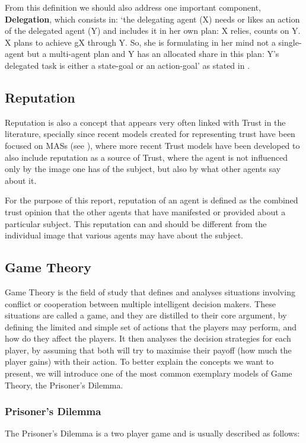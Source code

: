 From this definition we should also address one important component, \textbf{Delegation}, which consists in: `the delegating agent (X) needs or likes an action of the delegated agent (Y) and includes it in her own plan: X relies, counts on Y. X plans to achieve gX through Y. So, she is formulating in her mind not a single-agent but a multi-agent plan and Y has an allocated share in this plan: Y’s delegated task is either a state-goal or an action-goal' as stated in \cite{Castelfranchi1998}.



\subsection{Reputation}
\label{subsec:Reputation}
Reputation is also a concept that appears very often linked with Trust in the literature, specially since recent models created for representing trust have been focused on \acp{MAS} (see \cite{Abdul-rahman2000, Sabater2002, Sabater2006, Huynh2006, Pinyol2009}), where more recent Trust models have been developed to also include reputation as a source of Trust, where the agent is not influenced only by the image one has of the subject, but also by what other agents say about it.

For the purpose of this report, reputation of an agent is defined as the combined trust opinion that the other agents that have manifested or provided about a particular subject. This reputation can and should be different from the individual image that various agents may have about the subject.


\subsection{Game Theory}
\label{subsec:GameTheory}
Game Theory is the field of study that defines and analyses situations involving conflict or cooperation between multiple intelligent decision makers. These situations are called a game, and they are distilled to their core argument, by defining the limited and simple set of actions that the players may perform, and how do they affect the players. It then analyses the decision strategies for each player, by assuming that both will try to maximise their payoff (how much the player gains) with their action. To better explain the concepts we want to present, we will introduce one of the most common exemplary models of Game Theory, the Prisoner's Dilemma.

\subsubsection{Prisoner's Dilemma}
\label{subsubsec:PrisonersDilemma}
The Prisoner's Dilemma is a two player game and is usually described as follows:

